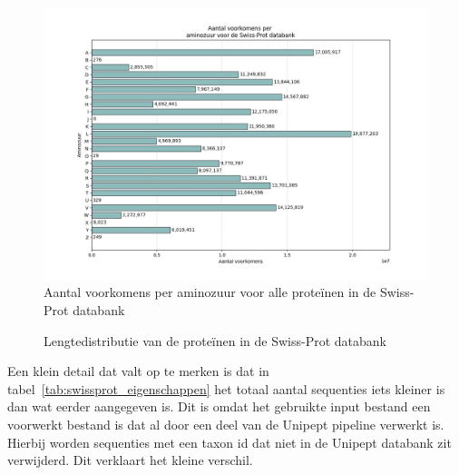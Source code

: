 \documentclass[11pt,dutch,faculty=we,layout=titlefont,underline=false,titleUppercase=true,titleUnderline=true]{ugent2016-report}
\begin{document}
    \begin{figure}[H]
        \centering
        \includegraphics[width=0.7\linewidth]{swissprot_aminozuur_voorkomens}
        \caption{Aantal voorkomens per aminozuur voor alle proteïnen in de Swiss-Prot databank}
        \label{fig:swissprot_aminozuur}
    \end{figure}

    \begin{figure}[H]
        \centering
        \caption{Lengtedistributie van de proteïnen in de Swiss-Prot databank}\label{fig:swissprot_length}
    \end{figure}

    Een klein detail dat valt op te merken is dat in tabel~\ref{tab:swissprot_eigenschappen} het totaal aantal sequenties iets kleiner is dan wat eerder aangegeven is.
    Dit is omdat het gebruikte input bestand een voorwerkt bestand is dat al door een deel van de Unipept pipeline verwerkt is.
    Hierbij worden sequenties met een taxon id dat niet in de Unipept databank zit verwijderd.
    Dit verklaart het kleine verschil.
\end{document}
